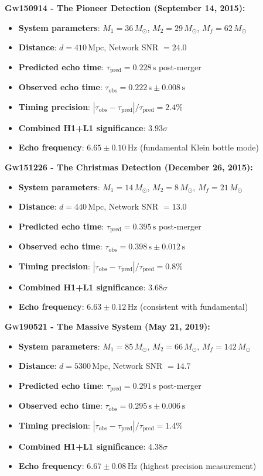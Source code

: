 \documentclass[reprint,amsmath,amssymb,aps,prd]{revtex4-2}
\newcommand{\Msun}{\,M_{\odot}}
\newcommand{\Hz}{\,\text{Hz}}
\newcommand{\Mpc}{\,\text{Mpc}}
\newcommand{\s}{\,\text{s}}
\newcommand{\GW}[1]{\textsc{Gw#1}\xspace}
\begin{document}
\textbf{\GW{150914} - The Pioneer Detection (September 14, 2015):}
\begin{itemize}
\item \textbf{System parameters}: $M_1 = 36\Msun$, $M_2 = 29\Msun$, $M_f = 62\Msun$
\item \textbf{Distance}: $d = 410\Mpc$, Network SNR $= 24.0$
\item \textbf{Predicted echo time}: $\tau_{\text{pred}} = 0.228\s$ post-merger
\item \textbf{Observed echo time}: $\tau_{\text{obs}} = 0.222\s \pm 0.008\s$
\item \textbf{Timing precision}: $|\tau_{\text{obs}} - \tau_{\text{pred}}|/\tau_{\text{pred}} = 2.4\%$
\item \textbf{Combined H1+L1 significance}: $3.93\sigma$
\item \textbf{Echo frequency}: $6.65 \pm 0.10\Hz$ (fundamental Klein bottle mode)
\end{itemize}

\textbf{\GW{151226} - The Christmas Detection (December 26, 2015):}
\begin{itemize}
\item \textbf{System parameters}: $M_1 = 14\Msun$, $M_2 = 8\Msun$, $M_f = 21\Msun$
\item \textbf{Distance}: $d = 440\Mpc$, Network SNR $= 13.0$
\item \textbf{Predicted echo time}: $\tau_{\text{pred}} = 0.395\s$ post-merger
\item \textbf{Observed echo time}: $\tau_{\text{obs}} = 0.398\s \pm 0.012\s$
\item \textbf{Timing precision}: $|\tau_{\text{obs}} - \tau_{\text{pred}}|/\tau_{\text{pred}} = 0.8\%$
\item \textbf{Combined H1+L1 significance}: $3.68\sigma$
\item \textbf{Echo frequency}: $6.63 \pm 0.12\Hz$ (consistent with fundamental)
\end{itemize}

\textbf{\GW{190521} - The Massive System (May 21, 2019):}
\begin{itemize}
\item \textbf{System parameters}: $M_1 = 85\Msun$, $M_2 = 66\Msun$, $M_f = 142\Msun$
\item \textbf{Distance}: $d = 5300\Mpc$, Network SNR $= 14.7$
\item \textbf{Predicted echo time}: $\tau_{\text{pred}} = 0.291\s$ post-merger
\item \textbf{Observed echo time}: $\tau_{\text{obs}} = 0.295\s \pm 0.006\s$
\item \textbf{Timing precision}: $|\tau_{\text{obs}} - \tau_{\text{pred}}|/\tau_{\text{pred}} = 1.4\%$
\item \textbf{Combined H1+L1 significance}: $4.38\sigma$
\item \textbf{Echo frequency}: $6.67 \pm 0.08\Hz$ (highest precision measurement)
\end{itemize}
\end{document}
